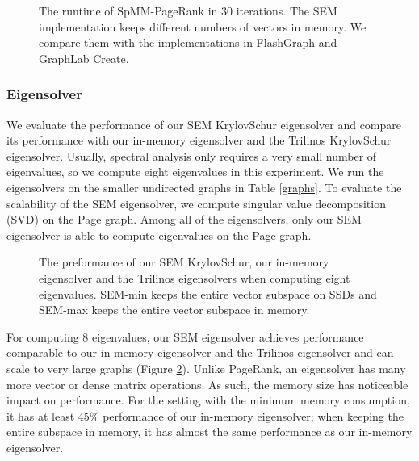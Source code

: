 \begin{figure}
	\begin{center}
		\footnotesize
		
		\caption{The runtime of SpMM-PageRank in 30 iterations. The SEM
			implementation keeps different numbers of vectors in memory.
			We compare them with the implementations in FlashGraph and GraphLab
		Create.}
		\label{perf:pagerank}
	\end{center}
\end{figure}

\subsubsection{Eigensolver}

We evaluate the performance of our SEM KrylovSchur eigensolver and compare
its performance
with our in-memory eigensolver and the Trilinos KrylovSchur eigensolver.
Usually, spectral analysis only requires a very small number of
eigenvalues, so we compute eight eigenvalues in this experiment. We run
the eigensolvers on the smaller undirected graphs
in Table \ref{graphs}. To evaluate the scalability of the SEM eigensolver,
we compute singular value decomposition (SVD) on the Page graph. Among all of
the eigensolvers, only our SEM eigensolver is able to compute eigenvalues
on the Page graph.

\begin{figure}
	\begin{center}
		\footnotesize
		
		\caption{The preformance of our SEM KrylovSchur, our in-memory eigensolver
			and the Trilinos eigensolvers when computing eight
			eigenvalues. SEM-min keeps the entire vector subspace on SSDs and
		SEM-max keeps the entire vector subspace in memory.}
		\label{fig:eigen}
	\end{center}
\end{figure}

For computing 8 eigenvalues, our SEM eigensolver achieves performance
comparable to our in-memory eigensolver and the Trilinos eigensolver
and can scale to very large graphs (Figure \ref{fig:eigen}).
Unlike PageRank, an eigensolver has many more vector or dense matrix operations.
As such, the memory size has noticeable impact on performance.
For the setting with the minimum memory consumption, it has at least 45\%
performance of our in-memory eigensolver; when keeping the entire subspace
in memory, it has almost the same performance as our in-memory eigensolver.

